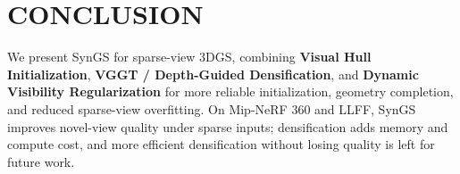 \section{CONCLUSION}
\label{sec:conclusion}

We present SynGS for sparse-view 3DGS, combining \textbf{Visual Hull Initialization}, \textbf{VGGT / Depth-Guided Densification}, and \textbf{Dynamic Visibility Regularization} for more reliable initialization, geometry completion, and reduced sparse-view overfitting. On Mip-NeRF 360 and LLFF, SynGS improves novel-view quality under sparse inputs; densification adds memory and compute cost, and more efficient densification without losing quality is left for future work.
